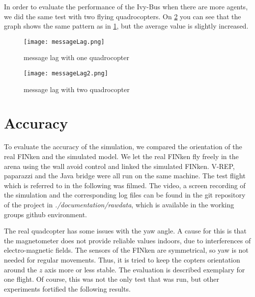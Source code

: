 In order to evaluate the performance of the Ivy-Bus when there are more agents, we did the same test with two flying quadrocopters. 
On \ref{fig:messageLag2} you can see that the graph shows the same pattern as in \ref{fig:messageLag}, but the average value is slightly increased.

\begin{figure}[h!]
 \begin{center}
  \texttt{[image: messageLag.png]}
 \end{center}
  \caption{message lag with one quadrocopter\label{fig:messageLag}}
\end{figure}

\begin{figure}[h!]
 \begin{center}
  \texttt{[image: messageLag2.png]}
 \end{center}
  \caption{message lag with two quadrocopter\label{fig:messageLag2}}
\end{figure}



\section{Accuracy}
\label{sec:accuracy}
To evaluate the accuracy of the simulation, we compared the orientation of the real FINken and the simulated model.  
We let the real FINken fly freely in the arena using the wall avoid control and linked the simulated FINken.
V-REP, paparazzi and the Java bridge were all run on the same machine.
The test flight which is referred to in the following was filmed.
The video, a screen recording of the simulation and the corresponding log files can be found in the git repository of the project in \emph{./documentation/rawdata}, which is available in the working groups github environment.

The real quadcopter has some issues with the yaw angle. 
A cause for this is that the magnetometer does not provide reliable values indoors, due to interferences of electro-magnetic fields.
The sensors of the FINken are symmetrical, so yaw is not needed for regular movements.
Thus, it is tried to keep the copters orientation around the $z$ axis more or less stable.
The evaluation is described exemplary for one flight. 
Of course, this was not the only test that was run, but other experiments fortified the following results.

